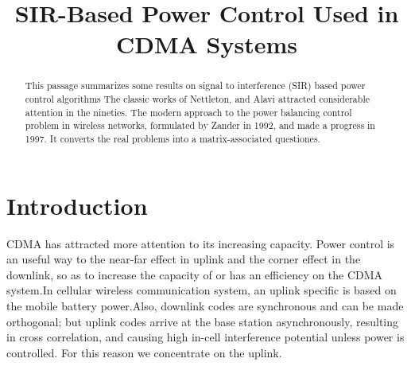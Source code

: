 \documentclass[conference]{IEEEtran}
\begin{document}
\title{SIR-Based Power Control Used in CDMA Systems}
\author{}


\maketitle \thispagestyle{plain}


\maketitle

\begin{abstract}
	This passage summarizes some results on signal to interference (SIR) based power control algorithms The classic works of Nettleton, and Alavi attracted considerable attention in the nineties. The modern approach to the power balancing control problem in wireless networks, formulated by Zander in 1992, and made a progress in 1997. It converts the real problems into a matrix-associated questiones. 
\end{abstract}


\section{Introduction}
CDMA has attracted more attention to its increasing capacity. Power control is an useful way to the near-far effect in uplink and the corner effect in the downlink, so as to increase the capacity of or has an efficiency on the CDMA system.In cellular wireless communication system, an uplink specific is based on the mobile battery power.Also, downlink codes are synchronous and can be made orthogonal; but uplink codes  arrive at the base station asynchronously, resulting in cross correlation, and causing high in-cell interference potential unless power is controlled. For this reason we concentrate on the uplink.
\end{document}
